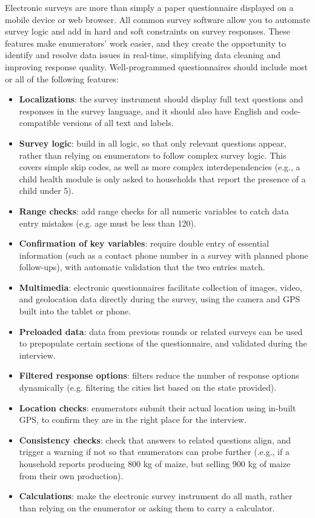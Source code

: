 Electronic surveys are more than simply a paper questionnaire displayed on a mobile device or web browser.
All common survey software allow you to automate survey logic
and add in hard and soft constraints on survey responses.
These features make enumerators' work easier,
and they create the opportunity to identify and resolve data issues in real-time,
simplifying data cleaning and improving response quality.
Well-programmed questionnaires should include most or all of the following features:

\begin{itemize}
  \item{\textbf{Localizations}}: the survey instrument should display full text questions and responses in the survey language, and it should also have English and code-compatible versions of all text and labels.
	\item{\textbf{Survey logic}}: build in all logic, so that only relevant questions appear, rather than relying on enumerators to follow complex survey logic. This covers simple skip codes, as well as more complex interdependencies (e.g., a child health module is only asked to households that report the presence of a child under 5).
	\item{\textbf{Range checks}}:  add range checks for all numeric variables to catch data entry mistakes (e.g. age must be less than 120).
	\item{\textbf{Confirmation of key variables}}: require double entry of essential information (such as a contact phone number in a survey with planned phone follow-ups), with automatic validation that the two entries match.
	\item{\textbf{Multimedia}}: electronic questionnaires facilitate collection of images, video, and geolocation data directly during the survey, using the camera and GPS built into the tablet or phone.
	\item{\textbf{Preloaded data}}: data from previous rounds or related surveys can be used to prepopulate certain sections of the questionnaire, and validated during the interview.
	\item{\textbf{Filtered response options}}: filters reduce the number of response options dynamically (e.g. filtering the cities list based on the state provided).
	\item{\textbf{Location checks}}: enumerators submit their actual location using in-built GPS, to confirm they are in the right place for the interview.
	\item{\textbf{Consistency checks}}: check that answers to related questions align, and trigger a warning if not so that enumerators can probe further (.e.g., if a household reports producing 800 kg of maize, but selling 900 kg of maize from their own production).
	\item{\textbf{Calculations}}: make the electronic survey instrument do all math, rather than relying on the enumerator or asking them to carry a calculator.
\end{itemize}

